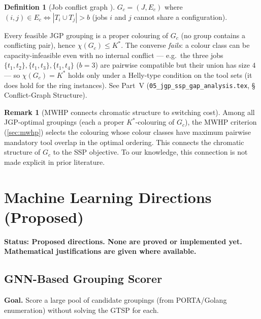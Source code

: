 \documentclass[11pt,a4paper]{article}
\theoremstyle{plain}
\theoremstyle{definition}
\newtheorem{definition}[theorem]{Definition}
\newtheorem{remark}[theorem]{Remark}
\newcommand{\Kstar}{K^*}
\begin{document}
\begin{definition}[Job conflict graph \cite{Crama1994}]
$G_c = (J, E_c)$ where $(i,j) \in E_c \iff |T_i \cup T_j| > b$
(jobs $i$ and $j$ cannot share a configuration).
\end{definition}

Every feasible JGP grouping is a proper colouring of $G_c$ (no group contains a
conflicting pair), hence $\chi(G_c) \le \Kstar$. The converse \emph{fails}: a colour
class can be capacity-infeasible even with no internal conflict --- e.g.\ the three jobs
$\{t_1,t_2\},\{t_1,t_3\},\{t_1,t_4\}$ ($b=3$) are pairwise compatible but their union has
size $4$ --- so $\chi(G_c)=\Kstar$ holds only under a Helly-type condition on the tool
sets (it does hold for the ring instances). See Part~V
(\texttt{05\_jgp\_ssp\_gap\_analysis.tex}, \S\,Conflict-Graph Structure).

\begin{remark}[MWHP connects chromatic structure to switching cost]
Among all JGP-optimal groupings (each a proper $\Kstar$-colouring of $G_c$), the MWHP
criterion (\cref{sec:mwhp})
selects the colouring whose colour classes have maximum pairwise mandatory tool
overlap in the optimal ordering. This connects the chromatic structure of $G_c$
to the SSP objective. To our knowledge, this connection is not made explicit
in prior literature.
\end{remark}

\section{Machine Learning Directions (Proposed)}
\label{sec:ml}

\begin{propbox}
\textbf{Status: Proposed directions. None are proved or implemented yet.
Mathematical justifications are given where available.}
\end{propbox}

\subsection{GNN-Based Grouping Scorer}

\noindent\textbf{Goal.} Score a large pool of candidate groupings (from PORTA/Golang
enumeration) without solving the GTSP for each.
\end{document}
